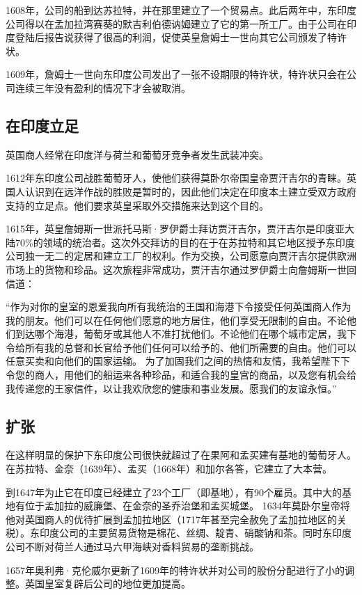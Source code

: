 \documentclass{ctexbook}
\begin{document}
1608年，公司的船到达苏拉特，并在那里建立了一个贸易点。此后两年中，东印度公司得以在孟加拉湾赛葵的默吉利伯德讷姆建立了它的第一所工厂。由于公司在印度登陆后报告说获得了很高的利润，促使英皇詹姆士一世向其它公司颁发了特许状。

1609年，詹姆士一世向东印度公司发出了一张不设期限的特许状，特许状只会在公司连续三年没有盈利的情况下才会被取消。

\subsection{在印度立足}
英国商人经常在印度洋与荷兰和葡萄牙竞争者发生武装冲突。

1612年东印度公司战胜葡萄牙人，使他们获得莫卧尔帝国皇帝贾汗吉尔的青睐。英国人认识到在远洋作战的胜败是暂时的，因此他们决定在印度本土建立受双方政府支持的立足点。他们要求英皇采取外交措施来达到这个目的。

1615年，英皇詹姆斯一世派托马斯·罗伊爵士拜访贾汗吉尔，贾汗吉尔是印度亚大陆70\%的领域的统治者。这次外交拜访的目的在于在苏拉特和其它地区授予东印度公司独一无二的定居和建立工厂的权利。作为交换，公司愿意向贾汗吉尔提供欧洲市场上的货物和珍品。这次旅程非常成功，贾汗吉尔通过罗伊爵士向詹姆斯一世回信道：

“作为对你的皇室的恩爱我向所有我统治的王国和海港下令接受任何英国商人作为我的朋友。他们可以在任何他们愿意的地方居住，他们享受无限制的自由。不论他们到达哪个海港，葡萄牙或其他人不准打扰他们。不论他们在哪个城市定居，我下令给所有我的总督和长官给予他们任何可以给予的、他们所需要的自由。他们可以任意买卖和向他们的国家运输。
为了加固我们之间的热情和友情，我希望陛下下令您的商人，用他们的船运来各种珍品，和适合我的皇宫的商品，以及您有机会给我传递您的王家信件，以让我欢欣您的健康和事业发展。愿我们的友谊永恒。”
\subsection{扩张}
在这样明显的保护下东印度公司很快就超过了在果阿和孟买建有基地的葡萄牙人。在苏拉特、金奈（1639年）、孟买（1668年）和加尔各答，它建立了大本营。

到1647年为止它在印度已经建立了23个工厂（即基地），有90个雇员。其中大的基地有位于孟加拉的威廉堡、在金奈的圣乔治堡和孟买城堡。
1634年莫卧尔皇帝将他对英国商人的优待扩展到孟加拉地区（1717年甚至完全赦免了孟加拉地区的关税）。东印度公司的主要贸易货物是棉花、丝绸、靛青、硝酸钠和茶。同时东印度公司不断对荷兰人通过马六甲海峡对香料贸易的垄断挑战。

1657年奥利弗·克伦威尔更新了1609年的特许状并对公司的股份分配进行了小的调整。英国皇室复辟后公司的地位更加提高。
\end{document}
